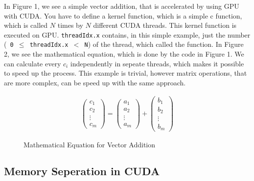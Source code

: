 \documentclass[conference]{IEEEtran}
\begin{document}
		In Figure 1, we see a simple vector addition, that is accelerated by using GPU with CUDA. You have to define a kernel function, which is a simple c function, which is called $N$ times by $N$ different CUDA threads. This kernel function is executed on GPU. \texttt{threadIdx.x} contains, in this simple example, just the number (\texttt{ 0 $\leq$ threadIdx.x $<$ N}) of the thread, which called the function. In Figure 2, we see the mathematical equation, which is done by the code in Figure 1. We can calculate every $c_i$ independently in sepeate threads, which makes it possible to speed up the process. This example is trivial, however matrix operations, that are more complex, can be speed up with the same approach. \cite{cudap}
		\begin{figure}[htbp] 
			\begin{align*}
				\begin{pmatrix}
				c_{1} \\
				c_{2} \\
				\vdots \\
				c_{m}
				\end{pmatrix} 
				= 
				\begin{pmatrix}
				a_{1} \\
				a_{2} \\
				\vdots \\
				a_{m}
				\end{pmatrix}
				+ 
				\begin{pmatrix}
				b_{1} \\
				b_{2} \\
				\vdots \\
				b_{m}
				\end{pmatrix}			
			\end{align*}
			\caption{Mathematical Equation for Vector Addition}
		\end{figure}
		
	
	\subsection{Memory Seperation in CUDA}
	
	
\end{document}

